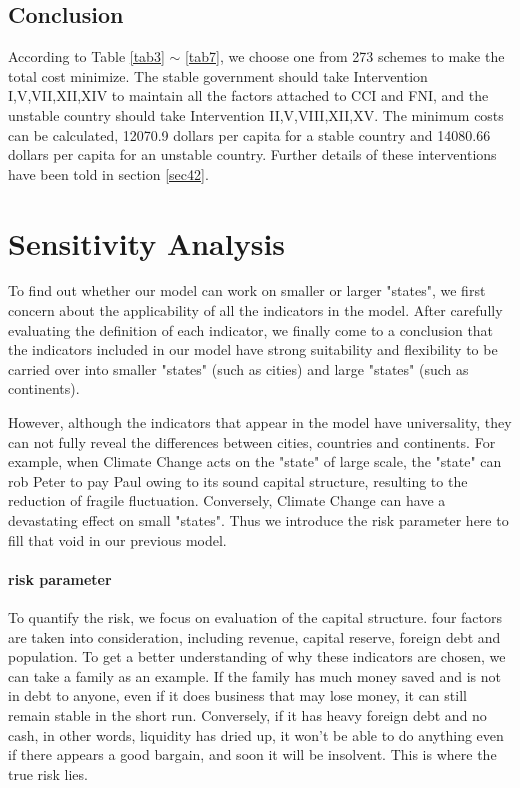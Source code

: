 \documentclass[a4paper,12pt]{article}
\begin{document}
\subsection{Conclusion}

According to Table \ref{tab3} $\sim$ \ref{tab7}, we choose one from 273 schemes to make the total cost minimize. The stable government should take Intervention I,V,VII,XII,XIV to maintain all the factors attached to CCI and FNI, and the unstable country should take Intervention II,V,VIII,XII,XV. The minimum costs can be calculated, 12070.9 dollars per capita for a stable country and 14080.66 dollars per capita for an unstable country. Further details of these interventions have been told in section \ref{sec42}. 

\section{Sensitivity Analysis}
To find out whether our model can work on smaller or larger "states", we first concern about the applicability of all the indicators in the model. After carefully evaluating the definition of each indicator, we finally come to a conclusion that the indicators included in our model have strong suitability and flexibility to be carried over into smaller "states" (such as cities) and large "states" (such as continents). 

However, although the indicators that appear in the model have universality, they can not fully reveal the differences between cities, countries and continents. For example, when Climate Change acts on the "state" of large scale, the "state" can rob Peter to pay Paul owing to its sound capital structure, resulting to the reduction of fragile fluctuation. Conversely, Climate Change can have a devastating effect on small "states". Thus we introduce the risk parameter here to fill that void in our previous model.

\paragraph{risk parameter}
To quantify the risk, we focus on evaluation of the capital structure. four factors are taken into consideration, including revenue, capital reserve, foreign debt and population. To get a better understanding of why these indicators are chosen, we can take a family as an example. If the family has much money saved and is not in debt to anyone, even if it does business that may lose  money, it can still remain stable in the short run. Conversely, if it has heavy foreign debt and no cash, in other words, liquidity has dried up, it won't be able to do anything even if there appears a good bargain, and soon it will be insolvent. This is where the true risk lies. 
\end{document}
